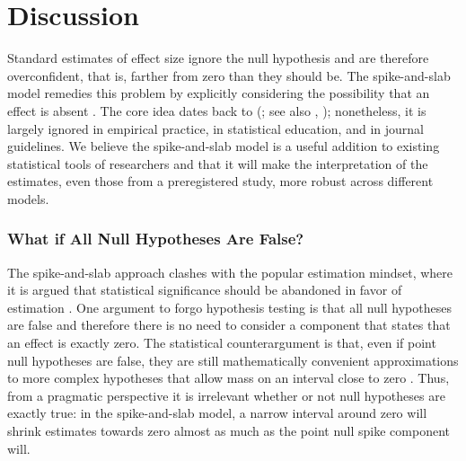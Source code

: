 \documentclass[a4paper]{article}
\newenvironment{revision}{\color{teal}}{\color{black}}
\begin{document}
\section*{Discussion}
Standard estimates of effect size ignore the null hypothesis and are therefore overconfident, that is, \begin{revision}farther\end{revision} from zero \begin{revision}than they should be\end{revision}. The spike-and-slab model remedies this problem by explicitly considering the possibility that an effect is absent \parencite{Robinson2019,RouderEtAl2018PBR}. The core idea dates back to
\citeauthor{Jeffreys1939} (\citeyear{Jeffreys1939}; see also \citeauthor{ly2020bayesian}, \citeyear{ly2020bayesian}); nonetheless, it is \begin{revision}largely\end{revision} ignored in empirical practice, in statistical education, and in journal guidelines.
\begin{revision}%
We believe the spike-and-slab model is a useful addition to existing statistical tools of researchers and that it will make the interpretation of the estimates, even those from a preregistered study, more robust across different models.
\end{revision}

\subsubsection*{What if All Null Hypotheses Are False?}
The spike-and-slab approach clashes with the popular estimation mindset, where it is argued that statistical significance should be abandoned in favor of estimation \parencite{McShane2019abandon, Cumming2016introduction, valentine2015life, Cumming2014}. 
One argument to forgo hypothesis testing is that all null hypotheses are false \parencite{Cohen1990, Meehl1978} and therefore there is no need to consider a component that states that an effect is exactly zero. 
The statistical counterargument is that, even if point null hypotheses are false, they are still mathematically convenient approximations to more complex hypotheses that allow mass on an interval close to zero \parencite[\begin{revision}i.e., perinull hypotheses;\end{revision}][]{ly2020bayesian2, george1993variable, BergerDelampady1987}. 
Thus, from a pragmatic perspective it is irrelevant whether or not null hypotheses are exactly true: in the spike-and-slab model, a \begin{revision}narrow interval around zero\end{revision} will shrink estimates towards zero almost as much as the point null spike component will. 
\end{document}
